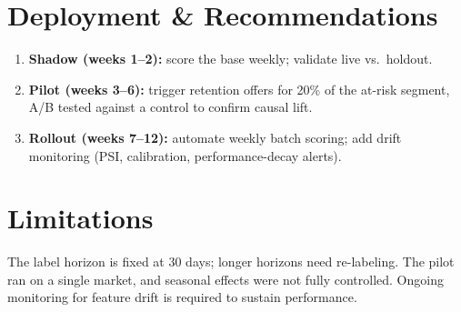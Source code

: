 \documentclass[11pt]{article}
\begin{document}
\section{Deployment \& Recommendations}
\begin{enumerate}[leftmargin=1.4em,itemsep=3pt]
  \item \textbf{Shadow (weeks 1--2):} score the base weekly; validate live vs.\ holdout.
  \item \textbf{Pilot (weeks 3--6):} trigger retention offers for 20\% of the at-risk segment,
        A/B tested against a control to confirm causal lift.
  \item \textbf{Rollout (weeks 7--12):} automate weekly batch scoring; add drift monitoring
        (PSI, calibration, performance-decay alerts).
\end{enumerate}

\section{Limitations}
The label horizon is fixed at 30 days; longer horizons need re-labeling. The pilot ran on a
single market, and seasonal effects were not fully controlled. Ongoing monitoring for
feature drift is required to sustain performance.
\end{document}
